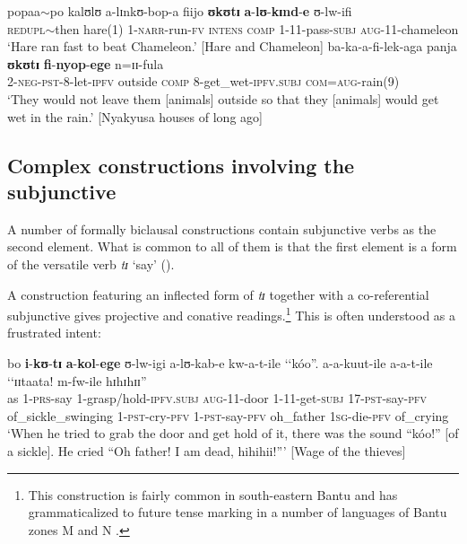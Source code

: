 \begin{exe}
\ex\label{exSubjunctivePurposeClause1}\gll popaa$\sim$po kalʊlʊ a-lɪnkʊ-bop-a fiijo \textbf{ʊkʊtɪ} \textbf{a}-\textbf{lʊ}-\textbf{kɪnd}-\textbf{e} ʊ-lw-ifi\\
\textsc{redupl}$\sim$then hare(1) 1-\textsc{narr}-run-\textsc{fv} \textsc{intens} \textsc{comp} 1-11-pass-\textsc{subj} \textsc{aug}-11-chameleon\\
\glt `Hare ran fast to beat Chameleon.' [Hare and Chameleon]
\ex\label{exSubjunctiveResultClause1}\gll ba-ka-a-fi-lek-aga panja \textbf{ʊkʊtɪ} \textbf{fi}-\textbf{nyop}-\textbf{ege} n=ɪɪ-fula\\
2-\textsc{neg}-\textsc{pst}-8-let-\textsc{ipfv} outside \textsc{comp} 8-get\_wet-\textsc{ipfv.subj} \textsc{com}=\textsc{aug}-rain(9)\\
\glt `They would not leave them [animals] outside so that they [animals] would get wet in the rain.' [Nyakyusa houses of long ago]
\end{exe}


\subsection{Complex constructions involving the subjunctive}\label{ComplexConructionsWithSubjunctive}
A number of formally biclausal constructions contain subjunctive verbs as the second element. What is common to all of them is that the first element is a form of the versatile verb \textit{tɪ} \lq  say' ().

A construction featuring an inflected form of \textit{tɪ} together with a co-referential subjunctive gives projective and conative readings.\footnote{This construction is fairly common in south-eastern Bantu \citep[153]{GueldemannT1996} and has grammaticalized to future tense marking in a number of languages of Bantu zones M and N \citep{BotneR1998a}.} This is often understood as a frustrated intent:
\begin{exe}
\ex \label{exConativeFrustrated2}\gll bo \textbf{i}-\textbf{kʊ}-\textbf{tɪ} \textbf{a}-\textbf{kol}-\textbf{ege} ʊ-lw-igi a-lʊ-kab-e kw-a-t-ile \textup{\lq\lq}kóo\textup{''}. a-a-kuut-ile a-a-t-ile \textup{\lq\lq}ɪɪtaata! m-fw-ile hɪhɪhɪɪ\textup{''}\\
as 1-\textsc{prs}-say 1-grasp/hold-\textsc{ipfv.subj} \textsc{aug}-11-door 1-11-get-\textsc{subj} 17-\textsc{pst}-say-\textsc{pfv} \phantom{\lq\lq}of\_sickle\_swinging 1-\textsc{pst}-cry-\textsc{pfv} 1-\textsc{pst}-say-\textsc{pfv} \phantom{\lq\lq}oh\_father \textsc{1sg}-die-\textsc{pfv} of\_crying\\
\glt `When he tried to grab the door and get hold of it, there was the sound ``kóo!'' [of a sickle]. He cried ``Oh father! I am dead, hihihii!''{}' [Wage of the thieves]
\end{exe}

